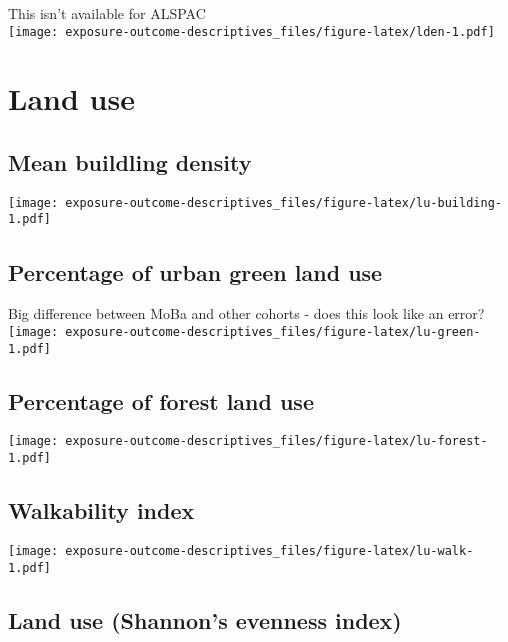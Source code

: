 \documentclass[]{article}
\begin{document}
This isn't available for ALSPAC\\
\texttt{[image: exposure-outcome-descriptives\_files/figure-latex/lden-1.pdf]}

\hypertarget{land-use}{%
\section{Land use}\label{land-use}}

\hypertarget{mean-buildling-density}{%
\subsection{Mean buildling density}\label{mean-buildling-density}}

\texttt{[image: exposure-outcome-descriptives\_files/figure-latex/lu-building-1.pdf]}

\hypertarget{percentage-of-urban-green-land-use}{%
\subsection{Percentage of urban green land use}\label{percentage-of-urban-green-land-use}}

Big difference between MoBa and other cohorts - does this look like an error?\\
\texttt{[image: exposure-outcome-descriptives\_files/figure-latex/lu-green-1.pdf]}

\hypertarget{percentage-of-forest-land-use}{%
\subsection{Percentage of forest land use}\label{percentage-of-forest-land-use}}

\texttt{[image: exposure-outcome-descriptives\_files/figure-latex/lu-forest-1.pdf]}

\hypertarget{walkability-index}{%
\subsection{Walkability index}\label{walkability-index}}

\texttt{[image: exposure-outcome-descriptives\_files/figure-latex/lu-walk-1.pdf]}

\hypertarget{land-use-shannons-evenness-index}{%
\subsection{Land use (Shannon's evenness index)}\label{land-use-shannons-evenness-index}}
\end{document}
